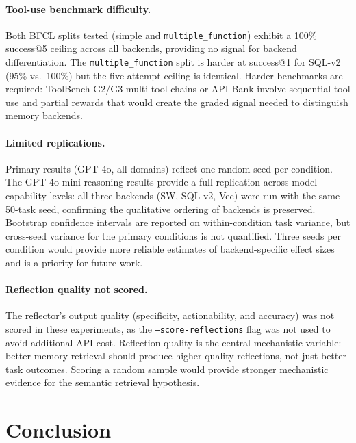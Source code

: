 \documentclass{article}
\begin{document}
\paragraph{Tool-use benchmark difficulty.}
Both BFCL splits tested (simple and \texttt{multiple\_function}) exhibit a
100\% success@5 ceiling across all backends, providing no signal for
backend differentiation. The \texttt{multiple\_function} split is harder
at success@1 for SQL-v2 (95\% vs.\ 100\%) but the five-attempt ceiling is
identical. Harder benchmarks are required: ToolBench G2/G3 multi-tool
chains \citep{qin2023toolllm} or API-Bank \citep{li2023apibank} involve
sequential tool use and partial rewards that would create the graded signal
needed to distinguish memory backends.

\paragraph{Limited replications.}
Primary results (GPT-4o, all domains) reflect one random seed per
condition. The GPT-4o-mini reasoning results provide a full replication
across model capability levels: all three backends (SW, SQL-v2, Vec) were
run with the same 50-task seed, confirming the qualitative ordering of
backends is preserved. Bootstrap confidence intervals are reported on
within-condition task variance, but cross-seed variance for the primary
conditions is not quantified. Three seeds per condition would provide more
reliable estimates of backend-specific effect sizes and is a priority for
future work.

\paragraph{Reflection quality not scored.}
The reflector's output quality (specificity, actionability, and accuracy)
was not scored in these experiments, as the \texttt{--score-reflections}
flag was not used to avoid additional API cost. Reflection quality is the
central mechanistic variable: better memory retrieval should produce
higher-quality reflections, not just better task outcomes. Scoring a random
sample would provide stronger mechanistic evidence for the semantic
retrieval hypothesis.

\section{Conclusion}
\label{sec:conclusion}
\end{document}
